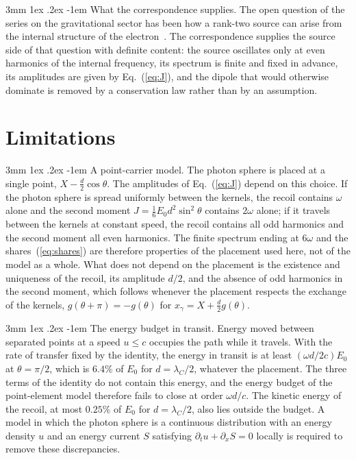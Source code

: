 \documentclass[%
 reprint, amsmath,amssymb, aps, prb, ]{revtex4-2}
\makeatletter
\numberwithin{equation}{section}
\renewcommand\paragraph{%
  \@startsection{paragraph}{4}{\z@}%
    {3mm \@plus 1ex \@minus .2ex}%
    {-1em}%
    {\normalfont\normalsize\itshape}}
\makeatother
\begin{document}
\paragraph{What the correspondence supplies.} The open question of the series on the gravitational sector has been how a rank-two source can arise from the internal structure of the electron~\cite{H58,H59}. The correspondence supplies the source side of that question with definite content: the source oscillates only at even harmonics of the internal frequency, its spectrum is finite and fixed in advance, its amplitudes are given by Eq.~(\ref{eq:J}), and the dipole that would otherwise dominate is removed by a conservation law rather than by an assumption.

\section{Limitations}
\label{sec:limits}

\paragraph{A point-carrier model.} The photon sphere is placed at a single point, $X - \tfrac d2\cos\theta$. The amplitudes of Eq.~(\ref{eq:J}) depend on this choice. If the photon sphere is spread uniformly between the kernels, the recoil contains $\omega$ alone and the second moment $J = \tfrac16E_0d^2\sin^2\theta$ contains $2\omega$ alone; if it travels between the kernels at constant speed, the recoil contains all odd harmonics and the second moment all even harmonics. The finite spectrum ending at $6\omega$ and the shares~(\ref{eq:shares}) are therefore properties of the placement used here, not of the model as a whole. What does not depend on the placement is the existence and uniqueness of the recoil, its amplitude $d/2$, and the absence of odd harmonics in the second moment, which follows whenever the placement respects the exchange of the kernels, $g(\theta + \pi) = -g(\theta)$ for $x_\gamma = X + \tfrac d2g(\theta)$.

\paragraph{The energy budget in transit.} Energy moved between separated points at a speed $u \le c$ occupies the path while it travels. With the rate of transfer fixed by the identity, the energy in transit is at least $(\omega d/2c)E_0$ at $\theta = \pi/2$, which is $6.4\%$ of $E_0$ for $d = \lambda_C/2$, whatever the placement. The three terms of the identity do not contain this energy, and the energy budget of the point-element model therefore fails to close at order $\omega d/c$. The kinetic energy of the recoil, at most $0.25\%$ of $E_0$ for $d = \lambda_C/2$, also lies outside the budget. A model in which the photon sphere is a continuous distribution with an energy density $u$ and an energy current $S$ satisfying $\partial_tu + \partial_xS = 0$ locally is required to remove these discrepancies.
\end{document}
